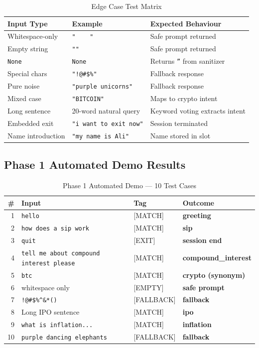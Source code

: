 \documentclass[12pt, a4paper]{article}
\begin{document}
\begin{table}[ht]
\centering
\caption{Edge Case Test Matrix}
\begin{tabularx}{\linewidth}{l X l}
\toprule
\rowcolor{tabh!12}
Input Type & Example & Expected Behaviour \\
\midrule
Whitespace-only  & \texttt{"\ \ \ \ "} & Safe prompt returned \\
Empty string     & \texttt{""} & Safe prompt returned \\
\texttt{None}    & \texttt{None} & Returns \texttt{''} from sanitizer \\
Special chars    & \texttt{"!@\#\$\%"} & Fallback response \\
Pure noise       & \texttt{"purple unicorns"} & Fallback response \\
Mixed case       & \texttt{"BITCOIN"} & Maps to crypto intent \\
Long sentence    & 20-word natural query & Keyword voting extracts intent \\
Embedded exit    & \texttt{"i want to exit now"} & Session terminated \\
Name introduction & \texttt{"my name is Ali"} & Name stored in slot \\
\bottomrule
\end{tabularx}
\end{table}

\subsection{Phase 1 Automated Demo Results}

\begin{table}[ht]
\centering
\caption{Phase 1 Automated Demo --- 10 Test Cases}
\begin{tabularx}{\linewidth}{r X l >{\bfseries\color{ok}}l}
\toprule
\rowcolor{tabh!12}
\# & Input & Tag & Outcome \\
\midrule
1  & \texttt{hello} & {[}MATCH{]} & greeting \\
2  & \texttt{how does a sip work} & {[}MATCH{]} & sip \\
3  & \texttt{quit} & {[}EXIT{]}  & session end \\
4  & \texttt{tell me about compound interest please} & {[}MATCH{]} & compound\_interest \\
5  & \texttt{btc} & {[}MATCH{]} & crypto (synonym) \\
6  & whitespace only & {[}EMPTY{]} & safe prompt \\
7  & \texttt{!@\#\$\%\^{}\&*()} & {[}FALLBACK{]} & fallback \\
8  & Long IPO sentence & {[}MATCH{]} & ipo \\
9  & \texttt{what is inflation...} & {[}MATCH{]} & inflation \\
10 & \texttt{purple dancing elephants} & {[}FALLBACK{]} & fallback \\
\bottomrule
\end{tabularx}
\end{table}
\end{document}
